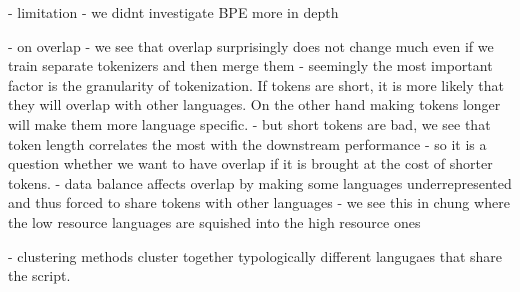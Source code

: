 



- limitation - we didnt investigate BPE more in depth

- on overlap
    - we see that overlap surprisingly does not change much even if we train separate tokenizers and then merge them
    - seemingly the most important factor is the granularity of tokenization. If tokens are short, it is more likely that they will overlap with other languages. On the other hand making tokens longer will make them more language specific.
    - but short tokens are bad, we see that token length correlates the most with the downstream performance
    - so it is a question whether we want to have overlap if it is brought at the cost of shorter tokens.
    - data balance affects overlap by making some languages underrepresented and thus forced to share tokens with other languages - we see this in chung where the low resource languages are squished into the high resource ones

- clustering methods cluster together typologically different langugaes that share the script. 

